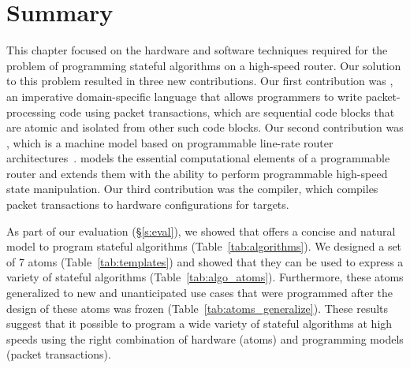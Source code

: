 \section{Summary}
\label{s:domino_summary}

This chapter focused on the hardware and software techniques required for the
problem of programming stateful algorithms on a high-speed router. Our solution
to this problem resulted in three new contributions. Our first contribution was
\pktlanguage, an imperative domain-specific language that allows programmers to
write packet-processing code using packet transactions, which are sequential
code blocks that are atomic and isolated from other such code blocks.  Our
second contribution was \absmachine, which is a machine model based on
programmable line-rate router architectures~\cite{flexpipe, xpliant, tofino}.
\absmachine models the essential computational elements of a programmable
router and extends them with the ability to perform programmable high-speed
state manipulation. Our third contribution was the \pktlanguage compiler, which
compiles packet transactions to hardware configurations for \absmachine
targets.

As part of our evaluation (\S\ref{s:eval}), we showed that \pktlanguage offers
a concise and natural model to program stateful algorithms
(Table~\ref{tab:algorithms}). We designed a set of 7 atoms
(Table~\ref{tab:templates}) and showed that they can be used to express a
variety of stateful algorithms (Table~\ref{tab:algo_atoms}). Furthermore, these
atoms generalized to new and unanticipated use cases that were programmed after
the design of these atoms was frozen (Table~\ref{tab:atoms_generalize}). These
results suggest that it possible to program a wide variety of stateful
algorithms at high speeds using the right combination of hardware (atoms) and
programming models (packet transactions).

